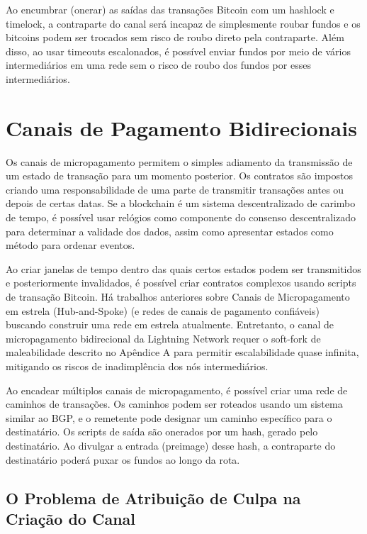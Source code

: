 \documentclass[letterpaper,11pt]{article}
\begin{document}
Ao encumbrar (onerar) as saídas das transações Bitcoin com um hashlock e
timelock, a contraparte do canal será incapaz de simplesmente roubar fundos e
os bitcoins podem ser trocados sem risco de roubo direto pela contraparte.
Além disso, ao usar timeouts escalonados, é possível enviar fundos por meio de
vários intermediários em uma rede sem o risco de roubo dos fundos por esses
intermediários.

\section{Canais de Pagamento Bidirecionais}

Os canais de micropagamento permitem o simples adiamento da transmissão de um
estado de transação para um momento posterior. Os contratos são impostos
criando uma responsabilidade de uma parte de transmitir transações antes ou
depois de certas datas. Se a blockchain é um sistema descentralizado de
carimbo de tempo, é possível usar relógios como componente do consenso
descentralizado\cite{lamportpaxos} para determinar a validade dos dados, assim
como apresentar estados como método para ordenar
eventos\cite{lamportclocks}.

Ao criar janelas de tempo dentro das quais certos estados podem ser
transmitidos e posteriormente invalidados, é possível criar contratos
complexos usando scripts de transação Bitcoin. Há trabalhos anteriores sobre
Canais de Micropagamento em estrela
(Hub-and-Spoke)\cite{akselrod}\cite{akselrod2}\cite{todd} (e redes de canais de
pagamento confiáveis\cite{amikopay}\cite{impulse}) buscando construir uma rede
em estrela atualmente. Entretanto, o canal de micropagamento bidirecional da
Lightning Network requer o soft-fork de maleabilidade descrito no Apêndice A
para permitir escalabilidade quase infinita, mitigando os riscos de
inadimplência dos nós intermediários.

Ao encadear múltiplos canais de micropagamento, é possível criar uma rede de
caminhos de transações. Os caminhos podem ser roteados usando um sistema
similar ao BGP, e o remetente pode designar um caminho específico para o
destinatário. Os scripts de saída são onerados por um hash, gerado pelo
destinatário. Ao divulgar a entrada (preimage) desse hash, a contraparte do
destinatário poderá puxar os fundos ao longo da rota.

\subsection{O Problema de Atribuição de Culpa na Criação do Canal}
\end{document}
